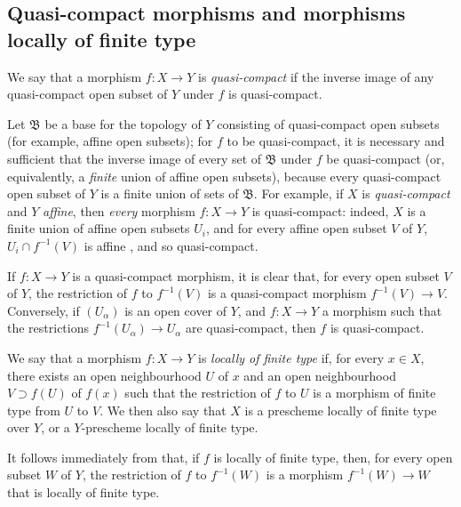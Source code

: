 \subsection{Quasi-compact morphisms and morphisms locally of finite type}
\label{subsection:I.6.6}

\begin{definition}[6.6.1]
\label{I.6.6.1}
We say that a morphism $f:X\to Y$ is \emph{quasi-compact} if the inverse image of any quasi-compact open subset of $Y$ under $f$ is quasi-compact.
\end{definition}

Let $\mathfrak{B}$ be a base for the topology of $Y$ consisting of quasi-compact open subsets (for example, affine open subsets);
for $f$ to be quasi-compact, it is necessary and sufficient that the inverse image of every set of $\mathfrak{B}$ under $f$ be quasi-compact (or, equivalently, a \emph{finite} union of affine open subsets), because every quasi-compact open subset of $Y$ is a finite union of sets of $\mathfrak{B}$.
For example, if $X$ is \emph{quasi-compact} and $Y$ \emph{affine}, then \emph{every} morphism $f: X\to Y$ is quasi-compact:
indeed, $X$ is a finite union of affine open subsets $U_i$, and for every affine open subset $V$ of $Y$, $U_i\cap f^{-1}(V)$ is affine , and so quasi-compact.

If $f: X\to Y$ is a quasi-compact morphism, it is clear that, for every open subset $V$ of $Y$, the restriction of $f$ to $f^{-1}(V)$ is a quasi-compact morphism $f^{-1}(V)\to V$.
Conversely, if $(U_\alpha)$ is an open cover of $Y$, and $f: X\to Y$ a morphism such that the restrictions $f^{-1}(U_\alpha)\to U_\alpha$ are quasi-compact, then $f$ is quasi-compact.

\begin{definition}[6.6.2]
\label{I.6.6.2}
We say that a morphism $f: X\to Y$ is \emph{locally of finite type} if, for every $x\in X$, there exists an open neighbourhood $U$ of $x$ and an open neighbourhood $V\supset f(U)$ of $f(x)$ such that the
restriction of $f$ to $U$ is a morphism of finite type from $U$ to $V$.
We then also say that $X$ is a prescheme locally of finite type over $Y$, or a $Y$-prescheme locally of finite type.
\end{definition}

It follows immediately from  that, if $f$ is locally of finite type, then, for every open subset $W$ of $Y$, the restriction of $f$ to $f^{-1}(W)$ is a morphism $f^{-1}(W)\to W$ that is locally of finite type.

